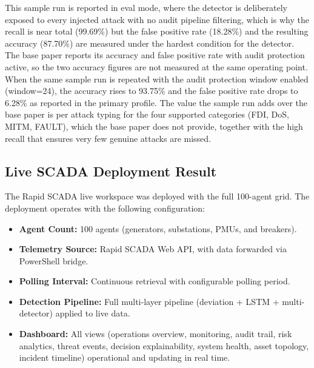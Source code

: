 \noindent
This sample run is reported in eval mode, where the detector is deliberately exposed to every injected attack with no audit pipeline filtering, which is why the recall is near total (99.69\%) but the false positive rate (18.28\%) and the resulting accuracy (87.70\%) are measured under the hardest condition for the detector. The base paper reports its accuracy and false positive rate with audit protection active, so the two accuracy figures are not measured at the same operating point. When the same sample run is repeated with the audit protection window enabled (window=24), the accuracy rises to 93.75\% and the false positive rate drops to 6.28\% as reported in the primary profile. The value the sample run adds over the base paper is per attack typing for the four supported categories (FDI, DoS, MITM, FAULT), which the base paper does not provide, together with the high recall that ensures very few genuine attacks are missed.

\par \vspace{0.35cm}

\subsection{Live SCADA Deployment Result}

The Rapid SCADA live workspace was deployed with the full 100-agent grid. The deployment operates with the following configuration:

\begin{itemize}
    \item \textbf{Agent Count:} 100 agents (generators, substations, PMUs, and breakers).
    \item \textbf{Telemetry Source:} Rapid SCADA Web API, with data forwarded via PowerShell bridge.
    \item \textbf{Polling Interval:} Continuous retrieval with configurable polling period.
    \item \textbf{Detection Pipeline:} Full multi-layer pipeline (deviation + LSTM + multi-detector) applied to live data.
    \item \textbf{Dashboard:} All views (operations overview, monitoring, audit trail, risk analytics, threat events, decision explainability, system health, asset topology, incident timeline) operational and updating in real time.
\end{itemize}

\par \vspace{0.35cm}


